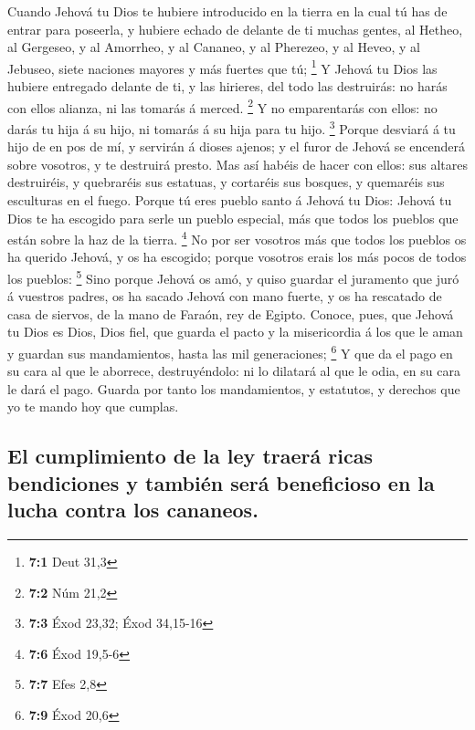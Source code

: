  Cuando Jehová tu Dios te hubiere introducido en la tierra
en la cual tú has de entrar para poseerla, y hubiere echado de delante
de ti muchas gentes, al Hetheo, al Gergeseo, y al Amorrheo, y al
Cananeo, y al Pherezeo, y al Heveo, y al Jebuseo, siete naciones mayores
y más fuertes que tú; \footnote{\textbf{7:1} Deut 31,3}  Y
Jehová tu Dios las hubiere entregado delante de ti, y las hirieres, del
todo las destruirás: no harás con ellos alianza, ni las tomarás á
merced. \footnote{\textbf{7:2} Núm 21,2}  Y no emparentarás
con ellos: no darás tu hija á su hijo, ni tomarás á su hija para tu
hijo. \footnote{\textbf{7:3} Éxod 23,32; Éxod 34,15-16} 
Porque desviará á tu hijo de en pos de mí, y servirán á dioses ajenos; y
el furor de Jehová se encenderá sobre vosotros, y te destruirá presto.
 Mas así habéis de hacer con ellos: sus altares destruiréis,
y quebraréis sus estatuas, y cortaréis sus bosques, y quemaréis sus
esculturas en el fuego.  Porque tú eres pueblo santo á
Jehová tu Dios: Jehová tu Dios te ha escogido para serle un pueblo
especial, más que todos los pueblos que están sobre la haz de la tierra.
\footnote{\textbf{7:6} Éxod 19,5-6}  No por ser vosotros más
que todos los pueblos os ha querido Jehová, y os ha escogido; porque
vosotros erais los más pocos de todos los pueblos: \footnote{\textbf{7:7}
  Efes 2,8}  Sino porque Jehová os amó, y quiso guardar el
juramento que juró á vuestros padres, os ha sacado Jehová con mano
fuerte, y os ha rescatado de casa de siervos, de la mano de Faraón, rey
de Egipto.  Conoce, pues, que Jehová tu Dios es Dios, Dios
fiel, que guarda el pacto y la misericordia á los que le aman y guardan
sus mandamientos, hasta las mil generaciones; \footnote{\textbf{7:9}
  Éxod 20,6}  Y que da el pago en su cara al que le
aborrece, destruyéndolo: ni lo dilatará al que le odia, en su cara le
dará el pago.  Guarda por tanto los mandamientos, y
estatutos, y derechos que yo te mando hoy que cumplas.

\hypertarget{el-cumplimiento-de-la-ley-traeruxe1-ricas-bendiciones-y-tambiuxe9n-seruxe1-beneficioso-en-la-lucha-contra-los-cananeos.}{%
\subsection{El cumplimiento de la ley traerá ricas bendiciones y también
será beneficioso en la lucha contra los
cananeos.}\label{el-cumplimiento-de-la-ley-traeruxe1-ricas-bendiciones-y-tambiuxe9n-seruxe1-beneficioso-en-la-lucha-contra-los-cananeos.}}

